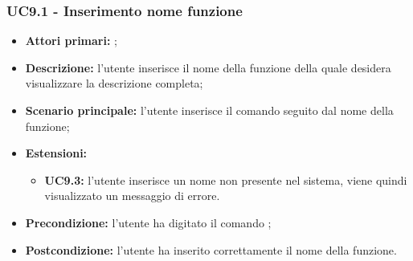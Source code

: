 \subsubsection{UC9.1 - Inserimento nome funzione}
\begin{itemize}
	\item \textbf{Attori primari:} \ua{};
	\item \textbf{Descrizione:} l’utente inserisce il nome della funzione della quale desidera visualizzare la descrizione completa;
	\item \textbf{Scenario principale:} l'utente inserisce il comando \info{} seguito dal nome della funzione;
	\item \textbf{Estensioni:} 
	\begin{itemize}
		\item \textbf{UC9.3:} l’utente inserisce un nome non presente nel sistema, viene quindi visualizzato un messaggio di errore.
	\end{itemize}
	\item \textbf{Precondizione:} l'utente ha digitato il comando \info{};
	\item \textbf{Postcondizione:} l’utente ha inserito correttamente il nome della funzione.
\end{itemize}